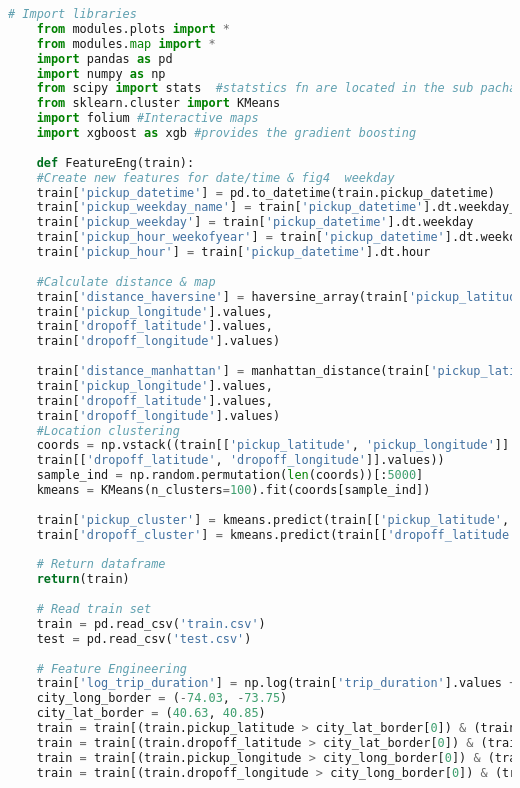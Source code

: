 \documentclass[12pt,report]{ucdavisthesis}
\begin{document}
     \begin{lstlisting}[language=Python, caption=code1]
    # Import libraries
    from modules.plots import *
    from modules.map import *
    import pandas as pd
    import numpy as np
    from scipy import stats  #statstics fn are located in the sub pachage scipy.stats
    from sklearn.cluster import KMeans
    import folium #Interactive maps 
    import xgboost as xgb #provides the gradient boosting 
    
    def FeatureEng(train):
    #Create new features for date/time & fig4  weekday
    train['pickup_datetime'] = pd.to_datetime(train.pickup_datetime)
    train['pickup_weekday_name'] = train['pickup_datetime'].dt.weekday_name
    train['pickup_weekday'] = train['pickup_datetime'].dt.weekday
    train['pickup_hour_weekofyear'] = train['pickup_datetime'].dt.weekofyear
    train['pickup_hour'] = train['pickup_datetime'].dt.hour
    
    #Calculate distance & map
    train['distance_haversine'] = haversine_array(train['pickup_latitude'].values, 
    train['pickup_longitude'].values, 
    train['dropoff_latitude'].values, 
    train['dropoff_longitude'].values)
    
    train['distance_manhattan'] = manhattan_distance(train['pickup_latitude'].values, 
    train['pickup_longitude'].values, 
    train['dropoff_latitude'].values, 
    train['dropoff_longitude'].values)
    #Location clustering
    coords = np.vstack((train[['pickup_latitude', 'pickup_longitude']].values,
    train[['dropoff_latitude', 'dropoff_longitude']].values))
    sample_ind = np.random.permutation(len(coords))[:5000]
    kmeans = KMeans(n_clusters=100).fit(coords[sample_ind])
    
    train['pickup_cluster'] = kmeans.predict(train[['pickup_latitude', 'pickup_longitude']])
    train['dropoff_cluster'] = kmeans.predict(train[['dropoff_latitude', 'dropoff_longitude']])
    
    # Return dataframe
    return(train)
    
    # Read train set
    train = pd.read_csv('train.csv')
    test = pd.read_csv('test.csv')
    
    # Feature Engineering
    train['log_trip_duration'] = np.log(train['trip_duration'].values + 1)    
    city_long_border = (-74.03, -73.75)
    city_lat_border = (40.63, 40.85)
    train = train[(train.pickup_latitude > city_lat_border[0]) & (train.pickup_latitude < city_lat_border[1])]
    train = train[(train.dropoff_latitude > city_lat_border[0]) & (train.dropoff_latitude < city_lat_border[1])]
    train = train[(train.pickup_longitude > city_long_border[0]) & (train.pickup_longitude < city_long_border[1])]
    train = train[(train.dropoff_longitude > city_long_border[0]) & (train.dropoff_longitude < city_long_border[1])]
    

\end{lstlisting}
\end{document}
